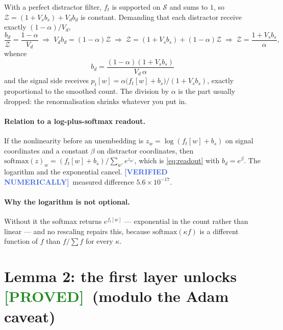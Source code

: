 \documentclass[11pt,a4paper]{article}
\theoremstyle{plain}
\theoremstyle{definition}
\newcommand{\PROVED}{\textcolor{ForestGreen}{\textbf{[PROVED]}}}
\newcommand{\NUM}{\textcolor{RoyalBlue}{\textbf{[VERIFIED NUMERICALLY]}}}
\newcommand{\Sig}{\mathcal{S}}
\newcommand{\1}{\mathbf{1}}
\begin{document}
With a perfect distractor filter, $f_t$ is supported on $\Sig$ and sums to $1$, so
$\mathcal{Z}=(1+V_sb_s)+V_db_d$ is constant. Demanding that each distractor receive exactly
$(1-\alpha)/V_d$,
\begin{equation}
\frac{b_d}{\mathcal{Z}}=\frac{1-\alpha}{V_d}
\;\Longrightarrow\;V_db_d=(1-\alpha)\mathcal{Z}
\;\Longrightarrow\;\mathcal{Z}=(1+V_sb_s)+(1-\alpha)\mathcal{Z}
\;\Longrightarrow\;\mathcal{Z}=\frac{1+V_sb_s}{\alpha},
\end{equation}
whence
\begin{equation}
\boxed{\;b_d=\frac{(1-\alpha)(1+V_sb_s)}{V_d\,\alpha}\;}
\end{equation}
and the signal side receives $p_t[w]=\alpha\bigl(f_t[w]+b_s\bigr)/(1+V_sb_s)$, exactly
proportional to the smoothed count. The division by $\alpha$ is the part usually dropped: the
renormalisation shrinks whatever you put in.

\paragraph{Relation to a log-plus-softmax readout.}
If the nonlinearity before an unembedding is $z_w=\log(f_t[w]+b_s)$ on signal coordinates and a
constant $\beta$ on distractor coordinates, then
$\mathrm{softmax}(z)_w=(f_t[w]+b_s)/\sum_{w'}e^{z_{w'}}$, which is \eqref{eq:readout} with
$b_d=e^{\beta}$. The logarithm and the exponential cancel.
\NUM\ measured difference $5.6\times10^{-17}$.

\paragraph{Why the logarithm is not optional.}
Without it the softmax returns $e^{f_t[w]}$ --- exponential in the count rather than linear --- and
no rescaling repairs this, because $\mathrm{softmax}(\kappa f)$ is a different function of $f$
than $f/\sum f$ for every $\kappa$.

\section{Lemma 2: the first layer unlocks \quad \PROVED\ (modulo the Adam caveat)}
\end{document}
